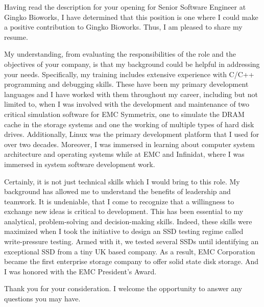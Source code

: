 \documentclass[busletter,dateno]{newlfm}
\begin{document}
\begin{newlfm}
Having read the description for your opening for Senior Software
Engineer at Gingko Bioworks, I have determined that this 
position is one where I could make a positive contribution to Gingko Bioworks.
Thus, I am pleased to share my resume.

My understanding, from evaluating the responsibilities of the role and the
objectives of your company, is that my background could be helpful in
addressing your needs. Specifically, my training includes extensive experience
with C/C++ programming and debugging skills. These have been my primary
development languages and I have worked with them throughout my career,
including but not limited to, when I was involved with the development and
maintenance of two critical simulation software for EMC Symmetrix, one to
simulate the DRAM cache in the storage systems and one the working of multiple
types of hard disk drives. Additionally, Linux was the primary development
platform that I used for over two decades. Moreover, I was immersed in
learning about computer system architecture and operating systems while at EMC
and Infinidat, where I was immersed in system software development work. 

Certainly, it is not just technical skills which I would bring to this role.
My background has allowed me to understand the benefits of leadership and
teamwork. It is undeniable, that I come to recognize that a willingness to
exchange new ideas is critical to development. This has been essential to my
analytical, problem-solving and decision-making skills. Indeed, these skills
were maximized when I took the initiative to design an SSD testing regime
called write-pressure testing. Armed with it, we tested several SSDs until
identifying an exceptional SSD from a tiny UK based company. As a result,
EMC Corporation became the first enterprise storage company to offer solid 
state disk storage. And I was honored with the EMC President's Award.

Thank you for your consideration.  I welcome the opportunity to answer any
questions you may have. 
\end{newlfm}
\end{document}
